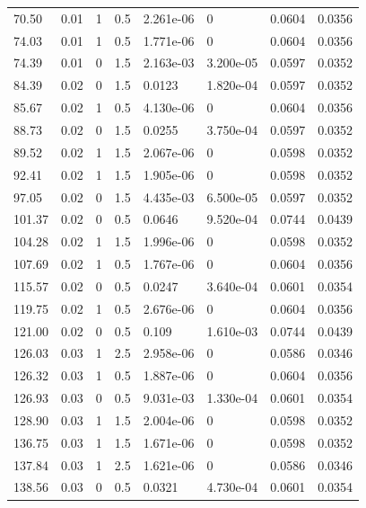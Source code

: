 \documentclass[preview]{standalone}
\begin{document}
{{\begin{tabular}{L{1.2cm}C{1.2cm} C{0.3cm}C{0.5cm} C{1.4cm}C{1.4cm} C{1.4cm}C{1.4cm}}
  70.50  &  0.01  & 1     & 0.5 &  2.261e-06  & 0  & 0.0604 &  0.0356   \\ 
  74.03  &  0.01  & 1     & 0.5 &  1.771e-06  & 0  & 0.0604 &  0.0356   \\ 
  74.39  &  0.01  & 0     & 1.5 &  2.163e-03  & 3.200e-05  & 0.0597 &  0.0352   \\ 
  84.39  &  0.02  & 0     & 1.5 &  0.0123  & 1.820e-04  & 0.0597 &  0.0352   \\ 
  85.67  &  0.02  & 1     & 0.5 &  4.130e-06  & 0  & 0.0604 &  0.0356   \\ 
  88.73  &  0.02  & 0     & 1.5 &  0.0255  & 3.750e-04  & 0.0597 &  0.0352   \\ 
  89.52  &  0.02  & 1     & 1.5 &  2.067e-06  & 0  & 0.0598 &  0.0352   \\ 
  92.41  &  0.02  & 1     & 1.5 &  1.905e-06  & 0  & 0.0598 &  0.0352   \\ 
  97.05  &  0.02  & 0     & 1.5 &  4.435e-03  & 6.500e-05  & 0.0597 &  0.0352   \\ 
  101.37  &  0.02  & 0     & 0.5 &  0.0646  & 9.520e-04  & 0.0744 &  0.0439   \\ 
  104.28  &  0.02  & 1     & 1.5 &  1.996e-06  & 0  & 0.0598 &  0.0352   \\ 
  107.69  &  0.02  & 1     & 0.5 &  1.767e-06  & 0  & 0.0604 &  0.0356   \\ 
  115.57  &  0.02  & 0     & 0.5 &  0.0247  & 3.640e-04  & 0.0601 &  0.0354   \\ 
  119.75  &  0.02  & 1     & 0.5 &  2.676e-06  & 0  & 0.0604 &  0.0356   \\ 
  121.00  &  0.02  & 0     & 0.5 &  0.109  & 1.610e-03  & 0.0744 &  0.0439   \\ 
  126.03  &  0.03  & 1     & 2.5 &  2.958e-06  & 0  & 0.0586 &  0.0346   \\ 
  126.32  &  0.03  & 1     & 0.5 &  1.887e-06  & 0  & 0.0604 &  0.0356   \\ 
  126.93  &  0.03  & 0     & 0.5 &  9.031e-03  & 1.330e-04  & 0.0601 &  0.0354   \\ 
  128.90  &  0.03  & 1     & 1.5 &  2.004e-06  & 0  & 0.0598 &  0.0352   \\ 
  136.75  &  0.03  & 1     & 1.5 &  1.671e-06  & 0  & 0.0598 &  0.0352   \\ 
  137.84  &  0.03  & 1     & 2.5 &  1.621e-06  & 0  & 0.0586 &  0.0346   \\ 
  138.56  &  0.03  & 0     & 0.5 &  0.0321  & 4.730e-04  & 0.0601 &  0.0354   \\ 

\end{tabular}}}
\end{document}
